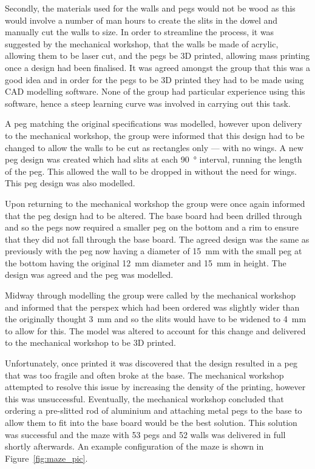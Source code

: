 Secondly, the materials used for the walls and pegs would not be wood as this
would involve a number of man hours to create the slits in the dowel and
manually cut the walls to size. In order to streamline the process, it was
suggested by the mechanical workshop, that the walls be made of acrylic, allowing
them to be laser cut, and the pegs be 3D printed, allowing mass printing
once a design had been finalised. It was agreed amongst the group that this was a good idea and
in order for the pegs to be 3D printed they had to be made using CAD modelling
software. None of the group had particular experience using this software, hence
a steep learning curve was involved in carrying out this task.

A peg matching the original specifications was modelled, however upon delivery
to the mechanical workshop, the group were informed that this design had to be 
changed to allow the walls to be cut as rectangles only --- with no wings. A new
peg design was created which had slits at each \SI{90}{\degree} interval,
running the length of the peg. This allowed the wall to be dropped in without
the need for wings. This peg design was also modelled.

Upon returning to the mechanical workshop the group were once again informed
that the peg design had to be altered. The base board had been drilled through
and so the pegs now required a smaller peg on the bottom and a rim to ensure
that they did not fall through the base board. The agreed design was the same as
previously with the peg now having a diameter of \SI{15}{\mm} with the small peg
at the bottom having the original \SI{12}{\mm} diameter and \SI{15}{\mm} in
height. The design was agreed and the peg was modelled.

Midway through modelling the group were called by the mechanical workshop and
informed that the perspex which had been ordered was slightly wider than the
originally thought \SI{3}{\mm} and so the slits would have to be widened to
\SI{4}{\mm} to allow for this. The model was altered to account for this change and delivered to the mechanical workshop to be 3D printed.

Unfortunately, once printed it was discovered that the design resulted in a peg
that was too fragile and often broke at the base. The mechanical workshop
attempted to resolve this issue by increasing the density of the printing,
however this was unsuccessful. Eventually, the mechanical workshop concluded
that ordering a pre-slitted rod of aluminium and attaching metal pegs to the
base to allow them to fit into the base board would be the best solution. This
solution was successful and the maze with 53 pegs and 52 walls was
delivered in full shortly afterwards. An example configuration of the maze is shown in Figure~\ref{fig:maze_pic}.

